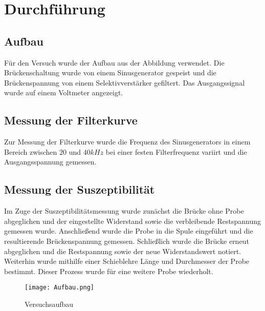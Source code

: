 \section{Durchführung}
\subsection{Aufbau}
Für den Versuch wurde der Aufbau aus der Abbildung verwendet. Die Brückenschaltung wurde von einem Sinusgenerator gespeist und die Brückenspannung von einem Selektivverstärker gefiltert. Das Ausgangssignal wurde auf einem Voltmeter angezeigt.
\subsection{Messung der Filterkurve}
Zur Messung der Filterkurve wurde die Frequenz des Sinusgenerators in einem Bereich zwischen $20$ und $40 kHz$ bei einer festen Filterfrequenz variirt und die Ausgangsspannung gemessen.
\subsection{Messung der Suszeptibilität}
Im Zuge der Suszeptibilitätsmessung wurde zunächst die Brücke ohne Probe abgeglichen und der eingestellte Widerstand
sowie die verbleibende Restspannung gemessen wurde. Anschließend wurde die Probe in die Spule eingeführt und die resultierende Brückenspannung gemessen. Schließlich wurde die Brücke erneut abgeglichen und die Restspannung sowie der neue Widerstandswert notiert. Weiterhin wurde mithilfe einer Schieblehre Länge und Durchmesser der Probe bestimmt. Dieser Prozess wurde für eine weitere Probe wiederholt.
\begin{figure}[h]
    \label{fig:block}
    \centering
    \texttt{[image: Aufbau.png]}
    \caption{Versuchsaufbau}
\end{figure}

